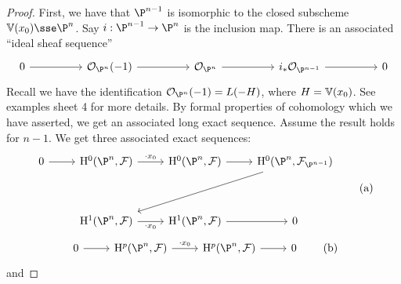\documentclass{article}
\begin{document}
\begin{proof}
    First, we have that \(\P^{n-1}\) is isomorphic to the closed subscheme \(\van(x_0) \sse \P^n\). Say \(i : \P^{n-1} \to \P^n\) is the inclusion map. There is an associated ``ideal sheaf sequence''
    \[\begin{tikzcd}
        0 && {\mcO_{\P^n}(-1)} && {\mcO_{\P^n}} && {i_*\mcO_{\P^{n-1}}} && 0
        \arrow[from=1-1, to=1-3]
        \arrow[from=1-3, to=1-5]
        \arrow[from=1-5, to=1-7]
        \arrow[from=1-7, to=1-9]
    \end{tikzcd}\]
    Recall we have the identification \(\mcO_{\P^n}(-1) = L(-H)\), where \(H = \mathbb{V}(x_0)\). See examples sheet 4 for more details. By formal properties of cohomology which we have asserted, we get an associated long exact sequence. Assume the result holds for \(n-1\). We get three associated exact sequences:
    \[\begin{tikzcd}
        0 & {\HH^0(\P^n, \mcF)} & {\HH^0(\P^n, \mcF)} & {\HH^0(\P^n, \mcF_{\P^{n-1}})} \\
        \\
        & {\HH^1(\P^n, \mcF)} & {\HH^1(\P^n, \mcF)} & 0
        \arrow[from=3-3, to=3-4]
        \arrow[from=1-1, to=1-2]
        \arrow["{\cdot x_0}", from=1-2, to=1-3]
        \arrow[from=1-3, to=1-4]
        \arrow[from=1-4, to=3-2]
        \arrow["{\cdot x_0}"', from=3-2, to=3-3]
    \end{tikzcd} \tag{a}\]
    \[\begin{tikzcd}
        0 & {\HH^p(\P^n, \mcF)} & {\HH^p(\P^n, \mcF)} & 0
        \arrow[from=1-1, to=1-2]
        \arrow["{\cdot x_0}", from=1-2, to=1-3]
        \arrow[from=1-3, to=1-4]
    \end{tikzcd} \tag{b}\]
    and

\end{proof}
\end{document}
